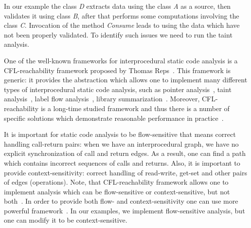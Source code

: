 In our example the class \textit{D} extracts data using the class \textit{A} as a source, then validates it using class \textit{B}, after that performs some computations involving the class \textit{C}.
Invocation of the method \textit{Consume} leads to using the data which have not been properly validated.
To identify such issues we need to run the taint analysis.

One of the well-known frameworks for interprocedural static code analysis is a CFL-reachability framework proposed by Thomas Reps~\cite{Reps}.
This framework is generic: it provides the abstraction which allows one to implement many different types of interprocedural static code analysis, such as pointer analysis~\cite{Zheng, JavaCFL}, taint analysis~\cite{Huang:2015:SPT:2771783.2771803}, label flow analysis~\cite{10.1007/11823230_7,CFLr}, library summarization~\cite{10.1007/978-3-662-54434-1_33}.
Moreover, CFL-reachability is a long-time studied framework and thus there is a number of specific solutions which demonstrate reasonable performance in practice~\cite{Wang:2017:GSD:3093315.3037744}.

It is important for static code analysis to be flow-sensitive that means correct handling call-return pairs: when we have an interprocedural graph, we have no explicit synchronization of call and return edges.
As a result, one can find a path which contains incorrect sequences of calls and returns.
Also, it is important to provide context-sensitivity: correct handling of read-write, get-set and other pairs of edges (operations).
Note, that CFL-reachability framework allows one to implement analysis which can be flow-sensitive or context-sensitive, but not both~\cite{Reps:2000:UCD:345099.345137}.
In order to provide both flow- and context-sensitivity one can use more powerful framework~\cite{Zhang:2017:CDA:3093333.3009848}.
In our examples, we implement flow-sensitive analysis, but one can modify it to be context-sensitive.

